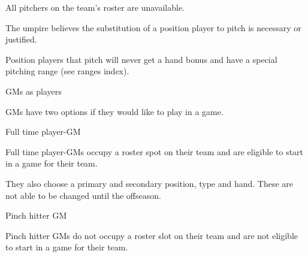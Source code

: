 \begin{deepEnumerate}
\begin{deepEnumerate}
\begin{deepEnumerate}
                                    \begin{deepEnumerate}
                                          \item All pitchers on the team's roster are unavailable.
                                          \item The umpire believes the substitution 
                                                of a position player to pitch is necessary or justified.
                                    \end{deepEnumerate}
                              \item Position players that pitch will never get a hand bonus
                                    and have a special pitching range (see ranges index). %
                        \end{deepEnumerate}
                  \item GMs as players
                        \begin{deepEnumerate}
                              \item GMs have two options if they would like to play in a game.
                                    \begin{deepEnumerate}
                                          \item Full time player-GM
                                                \begin{deepEnumerate}
                                                      \item Full time player-GMs occupy a roster spot on their team
                                                            and are eligible to start in a game for their team.
                                                      \item They also choose a primary and secondary position, type and hand.
                                                            These are not able to be changed until the offseason.
                                                \end{deepEnumerate}
                                          \item Pinch hitter GM
                                                \begin{deepEnumerate}
                                                      \item Pinch hitter GMs do not occupy a roster slot on their team
                                                            and are not eligible to start in a game for their team.

\end{deepEnumerate}
\end{deepEnumerate}
\end{deepEnumerate}
\end{deepEnumerate}
\end{deepEnumerate}
